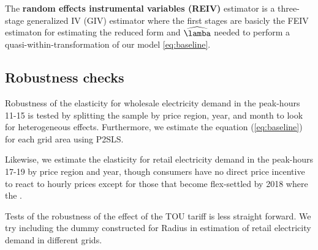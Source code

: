 \par
The \textbf{random effects instrumental variables (REIV)} estimator is a three-stage generalized IV (GIV) estimator where the first stages are basicly the FEIV estimaton for estimating the reduced form and $\widehat{\lamba}$ needed to perform a quasi-within-transformation of our model \eqref{eq:baseline}.

\subsection{Robustness checks}
\label{subsec:e_robustness}
Robustness of the elasticity for wholesale electricity demand in the peak-hours 11-15 is tested by splitting the sample by price region, year, and month to look for heterogeneous effects. Furthermore, we estimate the equation (\ref{eq:baseline}) for each grid area using P2SLS.
\par
Likewise, we estimate the elasticity for retail electricity demand in the peak-hours 17-19 by price region and year, though consumers have no direct price incentive to react to hourly prices except for those that become flex-settled by 2018 where the .
\bigskip\par
Tests of the robustness of the effect of the TOU tariff is less straight forward. We try including the dummy constructed for Radius in estimation of retail electricity demand in different grids.
